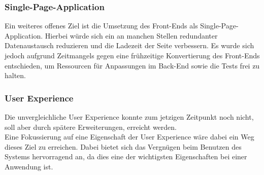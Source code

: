 \subsubsection*{Single-Page-Application}
Ein weiteres offenes Ziel ist die Umsetzung des Front-Ends als Single-Page-Application.
Hierbei würde sich ein an manchen Stellen redundanter Datenaustausch reduzieren und die Ladezeit der Seite verbessern.
Es wurde sich jedoch aufgrund Zeitmangels gegen eine frühzeitige Konvertierung des Front-Ends entschieden, um Ressourcen für Anpassungen im Back-End sowie die Tests frei zu halten.

\subsubsection*{User Experience}
Die unvergleichliche User Experience konnte zum jetzigen Zeitpunkt noch nicht, soll aber durch spätere Erweiterungen, erreicht werden. \\
Eine Fokussierung auf eine Eigenschaft der User Experience wäre dabei ein Weg dieses Ziel zu erreichen.
Dabei bietet sich das Vergnügen beim Benutzen des Systems hervorragend an, da dies eine der wichtigsten Eigenschaften bei einer Anwendung ist.
